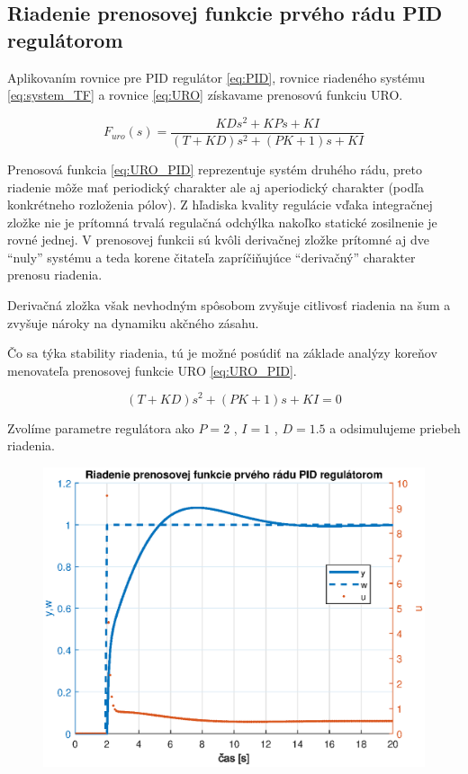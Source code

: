 \documentclass[a4paper,10pt]{article}
\begin{document}
\pagebreak

\subsection{Riadenie prenosovej funkcie prvého rádu PID regulátorom}

Aplikovaním rovnice pre PID regulátor \eqref{eq:PID}, rovnice riadeného systému \eqref{eq:system_TF} a rovnice \eqref{eq:URO} získavame prenosovú funkciu URO.

\begin{equation}
\label{eq:URO_PID}
F_{uro}(s)=\frac{KDs^2+KPs+KI}{\left(T+KD\right)s^2+\left(PK+1\right)s + KI}
\end{equation}

Prenosová funkcia \eqref{eq:URO_PID} reprezentuje systém druhého rádu, preto riadenie môže mať periodický charakter ale aj aperiodický charakter (podľa konkrétneho rozloženia pólov). Z hľadiska kvality regulácie vďaka integračnej zložke nie je prítomná trvalá regulačná odchýlka nakoľko statické zosilnenie je rovné jednej.
V prenosovej funkcii sú kvôli derivačnej zložke prítomné aj dve ``nuly'' systému a teda korene čitateľa zapríčiňujúce ``derivačný'' charakter prenosu riadenia.

Derivačná zložka však nevhodným spôsobom zvyšuje citlivosť riadenia na šum a zvyšuje nároky na dynamiku akčného zásahu.

Čo sa týka stability riadenia, tú je možné posúdiť na základe analýzy koreňov menovateľa prenosovej funkcie URO \eqref{eq:URO_PID}.

\begin{equation}
 \left(T+KD\right)s^2+\left(PK+1\right)s + KI=0
\end{equation}

Zvolíme parametre regulátora ako $P=2$ , $I=1$ , $D=1.5$ a odsimulujeme priebeh riadenia.

\begin{figure}[ht]
\centering
\includegraphics[scale=0.55]{PID_control}
\end{figure}
\end{document}
